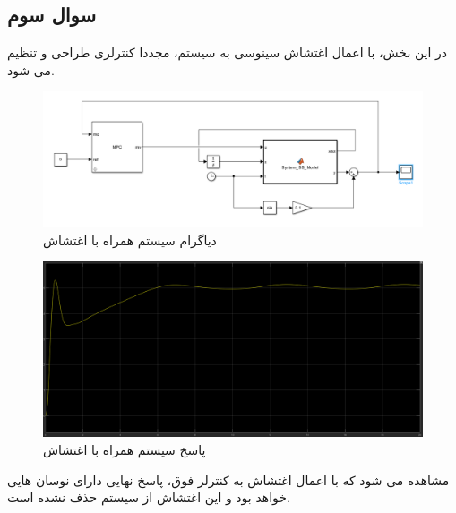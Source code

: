 \subsection*{سوال سوم}
در این بخش، با اعمال اغتشاش سینوسی به سیستم، مجددا کنترلری طراحی و تنظیم می شود.
\begin{figure}
	\centering
	\includegraphics[width=0.7\linewidth]{../img/Q1_3_diagram}
	\caption{دیاگرام سیستم همراه با اغتشاش}
	\label{fig:q13diagram}
\end{figure}
\begin{figure}
	\centering
	\includegraphics[width=0.7\linewidth]{../img/Q1_part3_response}
	\caption{پاسخ سیستم همراه با اغتشاش}
	\label{fig:q1part3response}
\end{figure}

مشاهده می شود که با اعمال اغتشاش به کنترلر فوق، پاسخ نهایی دارای نوسان هایی خواهد بود و این اغتشاش از سیستم حذف نشده است.
